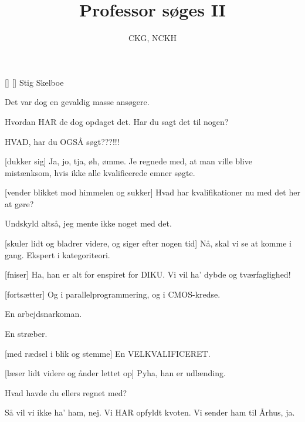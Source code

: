 \documentclass[a4paper,11pt]{article}
\title{Professor søges II}
\author{CKG, NCKH}
\begin{document}
\maketitle

\begin{roles}
  []
  [] Stig Skelboe
\end{roles}

\begin{sketch}


   Det var dog en gevaldig masse ansøgere.

   Hvordan HAR de dog opdaget det.  Har du sagt det til nogen?


   HVAD, har du OGSÅ søgt???!!!

  [dukker sig] Ja, jo, tja, øh, ømme.  Je regnede med, at man
  ville blive mistænksom, hvis ikke alle kvalificerede emner søgte.

  [vender blikket mod himmelen og sukker] Hvad har kvalifikationer nu med det her at gøre?

   Undskyld altså, jeg mente ikke noget med det.

  [skuler lidt og bladrer videre, og siger efter nogen tid]
  Nå, skal vi se at komme i gang.   Ekspert i kategoriteori.

  [fniser] Ha, han er alt for enspiret for DIKU.  Vi vil ha'
  dybde og tværfaglighed!

  [fortsætter] Og i parallelprogrammering, og i CMOS-kredse.

   En arbejdsnarkoman.

   En stræber.

  [med rædsel i blik og stemme] En VELKVALIFICERET.

  [læser lidt videre og ånder lettet op] Pyha, han er udlænding.

   Hvad havde du ellers regnet med?

   Så vil vi ikke ha' ham, nej.  Vi HAR opfyldt kvoten.  Vi sender ham til Århus, ja.

\end{sketch}
\end{document}
